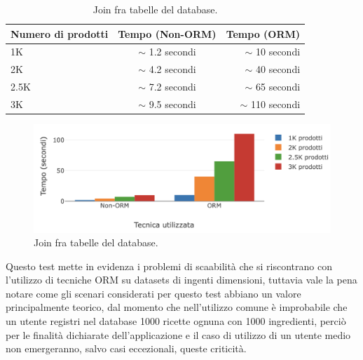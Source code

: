 \begin{table}[h!]
  \begin{center}
    \caption{Join fra tabelle del database.}
    \begin{tabular}{l|c|r} %
      \textbf{Numero di prodotti} & \textbf{Tempo (Non-ORM)} & \textbf{Tempo (ORM)}\\
      \hline
      1K & $\sim$ 1.2 secondi & $\sim$ 10 secondi\\
      2K & $\sim$ 4.2 secondi & $\sim$ 40 secondi\\
      2.5K & $\sim$ 7.2 secondi & $\sim$ 65 secondi\\
      3K & $\sim$ 9.5 secondi & $\sim$ 110 secondi\\
    \end{tabular}
  \end{center}
\end{table}

\begin{figure}[H]
  \includegraphics[width=\linewidth]{images/join-tables.png}
  \caption{Join fra tabelle del database.}
  \label{fig:jointables}
\end{figure}

Questo test mette in evidenza i problemi di scaabilità che si riscontrano con l'utilizzo di tecniche ORM su datasets di ingenti dimensioni, tuttavia vale la pena notare come gli scenari considerati per questo test abbiano un valore principalmente teorico, dal momento che nell'utilizzo comune è improbabile che un utente registri nel database 1000 ricette ognuna con 1000 ingredienti, perciò per le finalità dichiarate dell'applicazione e il caso di utilizzo di un utente medio non emergeranno, salvo casi eccezionali, queste criticità. 
